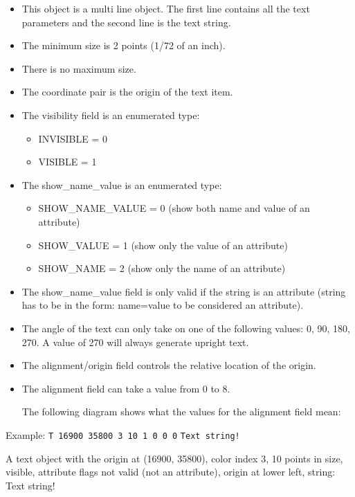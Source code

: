 \documentclass{article}
\begin{document}
\begin{itemize}
\item This object is a multi line object.  The first line contains all the 
      text parameters and the second line is the text string.
\item The minimum size is 2 points (1/72 of an inch).
\item There is no maximum size.
\item The coordinate pair is the origin of the text item.
\item The visibility field is an enumerated type:
\begin{itemize}
	\item INVISIBLE = 0 
	\item VISIBLE = 1
\end{itemize}
\item The show\_name\_value is an enumerated type:
\begin{itemize}
	\item SHOW\_NAME\_VALUE = 0  (show both name and value of an attribute)
	\item SHOW\_VALUE = 1 (show only the value of an attribute)
	\item SHOW\_NAME = 2  (show only the name of an attribute)
\end{itemize}
\item The show\_name\_value field is only valid if the string is an attribute
      (string has to be in the form: name=value to be considered an attribute).
\item The angle of the text can only take on one of the following values: 
      0, 90, 180, 270.  A value of 270 will always generate upright text.
\item The alignment/origin field controls the relative location of the 
      origin.
\item The alignment field can take a value from 0 to 8.

The following diagram shows what the values for the alignment field mean:

\begin{center}
\end{center}
\end{itemize}

Example:\newline 
{\tt T 16900 35800 3 10 1 0 0 0}\newline
{\tt Text string!}

A text object with the origin at (16900, 35800), color index 3, 10 points in
size, visible, attribute flags not valid (not an attribute), origin at lower
left, string: Text string!
\end{document}
